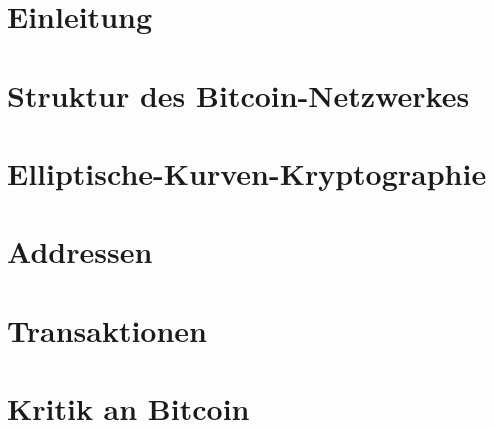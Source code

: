 \documentclass[12pt]{report}
\begin{document}


\tableofcontents

\chapter{Einleitung}


\chapter{Struktur des Bitcoin-Netzwerkes}


\chapter{Elliptische-Kurven-Kryptographie}


\chapter{Addressen}


\chapter{Transaktionen}


\chapter{Kritik an Bitcoin}

\end{document}
